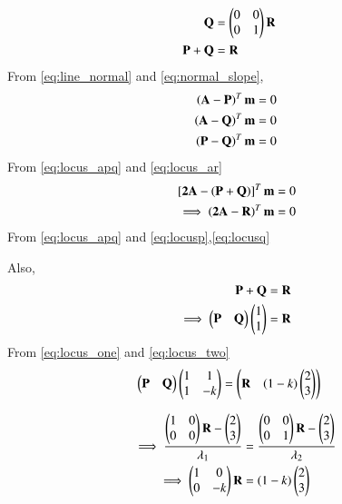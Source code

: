 \documentclass[journal,12pt,twocolumn]{IEEEtran}
\renewcommand\thesection{\arabic{section}}
\begin{document}
\begin{enumerate}[label=\thesection.\arabic*
,ref=\thesection.\theenumi]
\begin{align}
\\
\mathbf{Q}&= \begin{pmatrix}0 & 0\\ 0 & 1\end{pmatrix}\mathbf{R}
\label{eq:locusq}
\\
\mathbf{P}+\mathbf{Q} &=\mathbf{R}
\label{eq:locusr}
\end{align}
From \eqref{eq:line_normal} and \eqref{eq:normal_slope},
\begin{align}
\begin{split}
\left(\mathbf{A}-\mathbf{P}\right)^T\mathbf{m} &= 0
\\
\left(\mathbf{A}-\mathbf{Q}\right)^T\mathbf{m} &= 0
\\
\left(\mathbf{P}-\mathbf{Q}\right)^T\mathbf{m} &= 0
\end{split}
\label{eq:locus_apq}
\end{align}
%
From \eqref{eq:locus_apq} and \eqref{eq:locus_ar}
\begin{align}
{}\left[\mathbf{2A}-\left(\mathbf{P}+\mathbf{Q}\right)\right]^T\mathbf{m} &= 0
\\
\implies \left(\mathbf{2A}-\mathbf{R}\right)^T\mathbf{m} &= 0
\end{align}
%
From \eqref{eq:locus_apq} and \eqref{eq:locusp},\eqref{eq:locusq}

Also,
\begin{align}
\mathbf{P}+\mathbf{Q}&= \mathbf{R}
\\
\implies \begin{pmatrix}\mathbf{P} & \mathbf{Q} \end{pmatrix}\begin{pmatrix}1 \\ 1\end{pmatrix} &= \mathbf{R}
\label{eq:locus_two}
\end{align}
%
From \eqref{eq:locus_one} and \eqref{eq:locus_two}
%
\begin{align}
\begin{pmatrix}\mathbf{P} & \mathbf{Q} \end{pmatrix}\begin{pmatrix}1 & 1  \\ 1 & -k\end{pmatrix} &= \begin{pmatrix}\mathbf{R} & \left(1-k\right)\begin{pmatrix}2 \\ 3\end{pmatrix}\end{pmatrix}
\label{eq:locus_two}
\end{align}

\begin{align}
\implies \frac{\begin{pmatrix}1 & 0 \\ 0 & 0\end{pmatrix}\mathbf{R} -  \begin{pmatrix}2 \\ 3\end{pmatrix}}{ \lambda_1 } &= \frac{\begin{pmatrix}0 & 0 \\ 0 & 
1\end{pmatrix}\mathbf{R} -  \begin{pmatrix}2 \\ 3\end{pmatrix}}{ \lambda_2 }
\\
\implies \begin{pmatrix}1 & 0 \\ 0 & -k\end{pmatrix}\mathbf{R}  &= \left(1-k\right)  \begin{pmatrix}2 \\ 3\end{pmatrix}
\end{align}


\end{enumerate}
\end{document}
